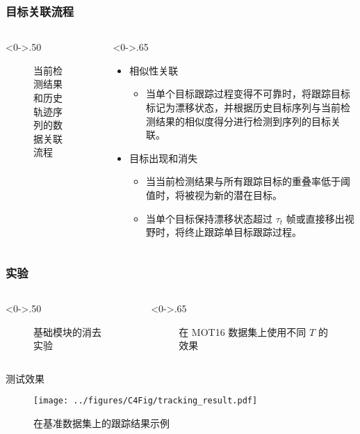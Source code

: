 \begin{frame}
	\frametitle{目标关联流程}
	\begin{columns}[T] %
		\begin{column}<0->{.50\textwidth}
			\begin{figure}[thpb]
				\centering
				\caption{当前检测结果和历史轨迹序列的数据关联流程}
			\end{figure}
		\end{column}
		\hfill%
		\begin{column}<0->{.65\textwidth}
			\begin{itemize}
				\item<1-> 相似性关联
				\begin{itemize}
					\item<1-> 当单个目标跟踪过程变得不可靠时，将跟踪目标标记为漂移状态，并根据历史目标序列与当前检测结果的相似度得分进行检测到序列的目标关联。
				\end{itemize}
				\item<1-> 目标出现和消失
				\begin{itemize}
					\item<1-> 当当前检测结果与所有跟踪目标的重叠率低于阈值时，将被视为新的潜在目标。
					\item<1-> 当单个目标保持漂移状态超过 $\tau_t$ 帧或直接移出视野时，将终止跟踪单目标跟踪过程。
				\end{itemize}
			\end{itemize}
		\end{column}%
	\end{columns}
\end{frame}



\begin{frame}
	\frametitle{实验}
	\begin{columns}[T] %
		\begin{column}<0->{.50\textwidth}
			\begin{figure}[thpb]
				\centering
				\caption{基础模块的消去实验}
			\end{figure}
		\end{column}
		\hfill%
		\begin{column}<0->{.65\textwidth}
			\begin{figure}[thpb]
				\centering
				\caption{在 MOT16 数据集上使用不同 $T$ 的效果}
			\end{figure}
		\end{column}%
	\end{columns}
\end{frame}


\begin{frame}{测试效果}
	\begin{figure}[!t]
		\centering
		\texttt{[image: ../figures/C4Fig/tracking\_result.pdf]}
		\caption{在基准数据集上的跟踪结果示例}
	\end{figure}
\end{frame}